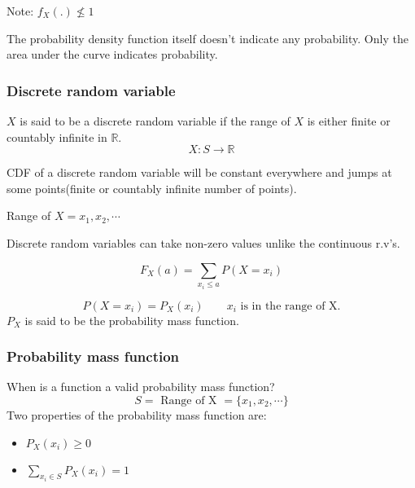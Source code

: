\documentclass{article}
\begin{document}
Note: $f_X(.) \nleq 1$

The probability density function itself doesn't indicate any probability.
Only the area under the curve indicates probability.

\subsubsection{Discrete random variable}

$X$ is said to be a discrete random variable if the range of $X$ is either finite or countably infinite in $\mathbb{R}$.
$$ X:S \to \mathbb{R}$$

CDF of a discrete random variable will be constant everywhere and jumps at some points(finite or countably infinite number of points).

Range of $X={x_1,x_2,\cdots}$

Discrete random variables can take non-zero values unlike the continuous r.v's.

$$ F_X(a)= \sum_{x_i \leq a}P(X= x_i)$$

$$ P(X=x_i)= P_X(x_i)\qquad x_i \text{ is in the range of X.}$$
$P_X$ is said to be the probability mass function.

\subsubsection{Probability mass function}
When is a function a valid probability mass function?
$$ S= \text{ Range of X }= \{ x_1, x_2, \cdots\}$$
Two properties of the probability mass function are:
\begin{itemize}
    \item $P_X(x_i) \geq 0$

    \item $ \sum_{x_i \in S}P_X(x_i)=1$
\end{itemize}
\end{document}
